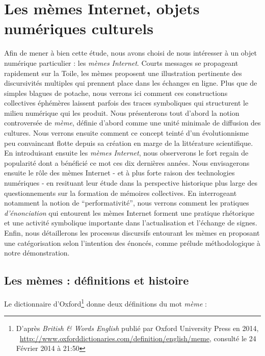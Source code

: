 \chapter[Les mèmes Internet, objets numériques culturels]{Les mèmes Internet, objets numériques culturels}

Afin de mener à bien cette étude, nous avons choisi de nous intéresser à un objet numérique particulier : les \textit{mèmes Internet}. Courts messages se propageant rapidement sur la Toile, les mèmes proposent une illustration pertinente des discursivités multiples qui prennent place dans les échanges en ligne. Plus que de simples blagues de potache, nous verrons ici comment ces constructions collectives éphémères laissent parfois des traces symboliques qui structurent le milieu numérique qui les produit. Nous présenterons tout d{\textquoteright}abord la notion controversée de \textit{mème}, définie d{\textquoteright}abord comme une unité minimale de diffusion des cultures. Nous verrons ensuite comment ce concept teinté d{\textquoteright}un évolutionnisme peu convaincant flotte depuis sa création en marge de la littérature scientifique. En introduisant ensuite les \textit{mèmes Internet}, nous observerons le fort regain de popularité dont a bénéficié ce mot ces dix dernières années\textit{. }Nous envisagerons ensuite le rôle des mèmes Internet - et à plus forte raison des technologies numériques - en resituant leur étude dans la perspective historique plus large des questionnements sur la formation de mémoires collectives. En interrogeant notamment la notion de {\textquotedblleft}performativité{\textquotedblright}, nous verrons comment les pratiques \textit{d{\textquoteright}énonciation }qui entourent les mèmes Internet forment une pratique rhétorique et une activité symbolique importante dans l{\textquoteright}actualisation et l{\textquoteright}échange de signes. Enfin, nous détaillerons les processus discursifs entourant les mèmes en proposant une catégorisation selon l{\textquoteright}intention des énoncés, comme prélude méthodologique à notre démonstration.

\section[Les mèmes : définitions et histoire ]{Les mèmes : définitions et histoire } 

Le dictionnaire d{\textquoteright}Oxford\footnote{ D{\textquoteright}après \textit{British \& Words English} publié par Oxford University Press en 2014, \ \url{http://www.oxforddictionaries.com/definition/english/meme}, consulté le 24 Février 2014 à 21:50} donne deux définitions du mot \textit{mème }: 

